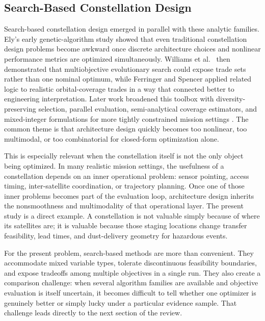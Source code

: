 \subsection{Search-Based Constellation Design}
Search-based constellation design emerged in parallel with these analytic families. Ely's early genetic-algorithm study \cite{ely1999GA} showed that even traditional constellation design problems become awkward once discrete architecture choices and nonlinear performance metrics are optimized simultaneously. Williams et al.\ \cite{williams2001MOGA} then demonstrated that multiobjective evolutionary search could expose trade sets rather than one nominal optimum, while Ferringer and Spencer \cite{ferringer2006jsr} applied related logic to realistic orbital-coverage trades in a way that connected better to engineering interpretation. Later work broadened this toolbox with diversity-preserving selection, parallel evaluation, semi-analytical coverage estimators, and mixed-integer formulations for more tightly constrained mission settings \cite{ferringer2007jsr,crisp2018revisit,lee2019ilp}. The common theme is that architecture design quickly becomes too nonlinear, too multimodal, or too combinatorial for closed-form optimization alone.

This is especially relevant when the constellation itself is not the only object being optimized. In many realistic mission settings, the usefulness of a constellation depends on an inner operational problem: sensor pointing, access timing, inter-satellite coordination, or trajectory planning. Once one of those inner problems becomes part of the evaluation loop, architecture design inherits the nonsmoothness and multimodality of that operational layer. The present study is a direct example. A constellation is not valuable simply because of where its satellites are; it is valuable because those staging locations change transfer feasibility, lead times, and dust-delivery geometry for hazardous events.

For the present problem, search-based methods are more than convenient. They accommodate mixed variable types, tolerate discontinuous feasibility boundaries, and expose tradeoffs among multiple objectives in a single run. They also create a comparison challenge: when several algorithm families are available and objective evaluation is itself uncertain, it becomes difficult to tell whether one optimizer is genuinely better or simply lucky under a particular evidence sample. That challenge leads directly to the next section of the review.

